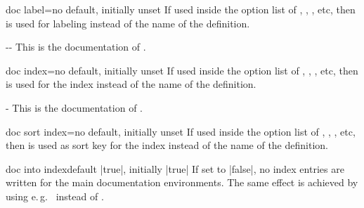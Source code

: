 \begin{docTcbKey}[][doc new={2019-09-18}]{doc label}{=}{no default, initially unset}
  If used inside the option list of , ,
  , etc, then  is used
  for labeling instead of the name of the definition.
\begin{dispExample}
\begin{docPathOperation*}[doc label=pathline]{-{}-}{}
  This is the documentation of .
\end{docPathOperation*}
\end{dispExample}
\end{docTcbKey}

\begin{docTcbKey}[][doc new={2020-01-07}]{doc index}{=}{no default, initially unset}
  If used inside the option list of , ,
  , etc, then  is used
  for the index instead of the name of the definition.
\begin{dispExample}
\begin{docPathOperation}[doc index=foo path (horizontal then vertical),
    doc label=pathline2]{-\textbar}{}
  This is the documentation of .
\end{docPathOperation}
\end{dispExample}
\end{docTcbKey}


\begin{docTcbKey}[][doc new={2020-04-23}]{doc sort index}{=}{no default, initially unset}
  If used inside the option list of , ,
  , etc, then  is used
  as sort key for the index instead of the name of the definition.
\begin{dispListing}
\begin{docCommands}[
    doc name        = l_tcobox_example_tl,
    doc sort index  = example_tl,  %
  ]{}
\end{docCommands}
\end{dispListing}
\end{docTcbKey}

\clearpage

\begin{docTcbKey}{doc into index}{}{default |true|, initially |true|}
  If set to |false|, no index entries are written for the main documentation
  environments. The same effect is achieved by using e.\,g.\ 
  instead of .
\end{docTcbKey}


